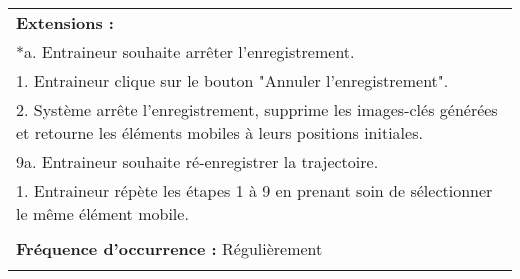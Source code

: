 \begin{longtable}{|p{16cm}|}
	\textbf{Extensions :}\\
	*a. Entraineur souhaite arrêter l'enregistrement.\\
	\hspace{0.5cm}1. Entraineur clique sur le bouton "Annuler l'enregistrement".\\
	\hspace{0.5cm}2. Système arrête l'enregistrement, supprime les images-clés générées et retourne les éléments mobiles à leurs positions initiales.\\
	9a. Entraineur souhaite ré-enregistrer la trajectoire.\\
	\hspace{0.5cm}1. Entraineur répète les étapes 1 à 9 en prenant soin de sélectionner le même élément mobile.\\
	\\
	\textbf{Fréquence d'occurrence :} Régulièrement\\
	\\
	\hline
\end{longtable}

